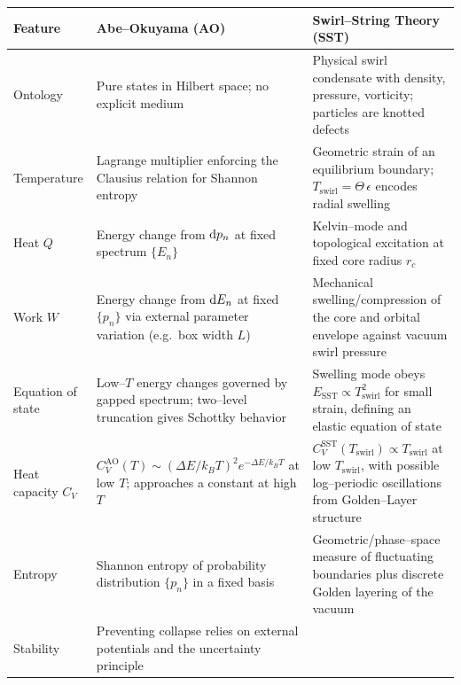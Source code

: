 \documentclass[11pt]{article}
\newcommand{\rc}{r_c}                                    %
\begin{document}
            \begin{table}[t]
                \centering
                \small
                \begin{tabular}{p{3cm}p{5.4cm}p{5.4cm}}
                    \hline
                    Feature & Abe--Okuyama (AO) & Swirl--String Theory (SST) \\
                    \hline
                    Ontology
                    & Pure states in Hilbert space; no explicit medium
                    & Physical swirl condensate with density, pressure, vorticity; particles are knotted defects \\
                    Temperature
                    & Lagrange multiplier enforcing the Clausius relation for Shannon entropy
                    & Geometric strain of an equilibrium boundary; $T_{\text{swirl}} = \Theta\,\epsilon$ encodes radial swelling \\
                    Heat $Q$
                    & Energy change from ${\rm d}p_n$ at fixed spectrum $\{E_n\}$
                    & Kelvin--mode and topological excitation at fixed core radius $\rc$ \\
                    Work $W$
                    & Energy change from ${\rm d}E_n$ at fixed $\{p_n\}$ via external parameter variation (e.g.\ box width $L$)
                    & Mechanical swelling/compression of the core and orbital envelope against vacuum swirl pressure \\
                    Equation of state
                    & Low--$T$ energy changes governed by gapped spectrum; two--level truncation gives Schottky behavior
                    & Swelling mode obeys $E_{\text{SST}} \propto T_{\text{swirl}}^{2}$ for small strain, defining an elastic equation of state \\
                    Heat capacity $C_V$
                    & $C_V^{\text{AO}}(T) \sim (\Delta E/k_B T)^2 e^{-\Delta E/k_B T}$ at low $T$; approaches a constant at high $T$
                    & $C_V^{\text{SST}}(T_{\text{swirl}})\propto T_{\text{swirl}}$ at low $T_{\text{swirl}}$, with possible log--periodic oscillations from Golden--Layer structure \\
                    Entropy
                    & Shannon entropy of probability distribution $\{p_n\}$ in a fixed basis
                    & Geometric/phase--space measure of fluctuating boundaries plus discrete Golden layering of the vacuum \\
                    Stability
                    & Preventing collapse relies on external potentials and the uncertainty principle

\end{tabular}
\end{table}
\end{document}

